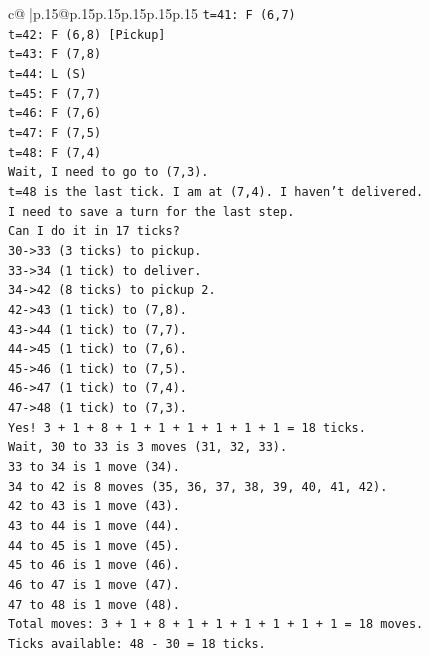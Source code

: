 \documentclass{article}
\begin{document}
{\begin{supertabular}{c@{$\;$}|p{.15\linewidth}@{}p{.15\linewidth}p{.15\linewidth}p{.15\linewidth}p{.15\linewidth}p{.15\linewidth}}
{{{\texttt{t=41: F (6,7)} \\
\texttt{t=42: F (6,8) {[}Pickup{]}} \\
\texttt{t=43: F (7,8)} \\
\texttt{t=44: L (S)} \\
\texttt{t=45: F (7,7)} \\
\texttt{t=46: F (7,6)} \\
\texttt{t=47: F (7,5)} \\
\texttt{t=48: F (7,4)} \\
\texttt{Wait, I need to go to (7,3).} \\
\texttt{t=48 is the last tick. I am at (7,4). I haven't delivered.} \\
\texttt{I need to save a turn for the last step.} \\
\texttt{Can I do it in 17 ticks?} \\
\texttt{30{-}>33 (3 ticks) to pickup.} \\
\texttt{33{-}>34 (1 tick) to deliver.} \\
\texttt{34{-}>42 (8 ticks) to pickup 2.} \\
\texttt{42{-}>43 (1 tick) to (7,8).} \\
\texttt{43{-}>44 (1 tick) to (7,7).} \\
\texttt{44{-}>45 (1 tick) to (7,6).} \\
\texttt{45{-}>46 (1 tick) to (7,5).} \\
\texttt{46{-}>47 (1 tick) to (7,4).} \\
\texttt{47{-}>48 (1 tick) to (7,3).} \\
\texttt{Yes! 3 + 1 + 8 + 1 + 1 + 1 + 1 + 1 + 1 = 18 ticks.} \\
\texttt{Wait, 30 to 33 is 3 moves (31, 32, 33).} \\
\texttt{33 to 34 is 1 move (34).} \\
\texttt{34 to 42 is 8 moves (35, 36, 37, 38, 39, 40, 41, 42).} \\
\texttt{42 to 43 is 1 move (43).} \\
\texttt{43 to 44 is 1 move (44).} \\
\texttt{44 to 45 is 1 move (45).} \\
\texttt{45 to 46 is 1 move (46).} \\
\texttt{46 to 47 is 1 move (47).} \\
\texttt{47 to 48 is 1 move (48).} \\
\texttt{Total moves: 3 + 1 + 8 + 1 + 1 + 1 + 1 + 1 + 1 = 18 moves.} \\
\texttt{Ticks available: 48 {-} 30 = 18 ticks.} \\
}}}
\end{supertabular}}
\end{document}
